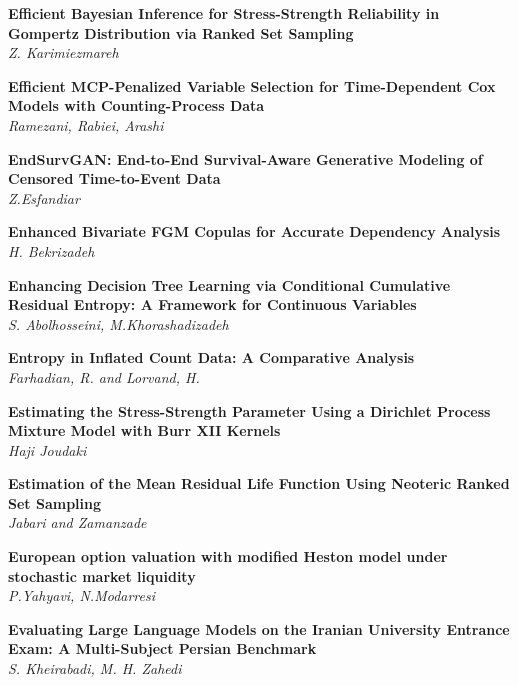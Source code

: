 \noindent
{\bf
Efficient Bayesian Inference for Stress-Strength Reliability in Gompertz Distribution via Ranked Set Sampling
}\dotfill \pageref{p.1128}\\
{\small \it
Z. Karimiezmareh
}


\noindent
{\bf
Efficient MCP-Penalized Variable Selection for Time-Dependent Cox Models with Counting-Process Data
}\dotfill \pageref{p.1335}\\
{\small \it
Ramezani, Rabiei, Arashi
}


\noindent
{\bf
EndSurvGAN: End-to-End Survival-Aware Generative Modeling of Censored Time-to-Event Data
}\dotfill \pageref{p.1180}\\
{\small \it
Z.Esfandiar
}


\noindent
{\bf
Enhanced Bivariate FGM Copulas for Accurate Dependency Analysis
}\dotfill \pageref{p.1033}\\
{\small \it
H. Bekrizadeh
}


\noindent
{\bf
Enhancing Decision Tree Learning via Conditional Cumulative Residual Entropy: A Framework for Continuous Variables
}\dotfill \pageref{p.1181}\\
{\small \it
S. Abolhosseini, M.Khorashadizadeh
}


\noindent
{\bf
Entropy in Inflated Count Data: A Comparative Analysis
}\dotfill \pageref{p.1003}\\
{\small \it
Farhadian, R. and Lorvand, H.
}


\noindent
{\bf
Estimating the Stress-Strength Parameter Using a Dirichlet Process Mixture Model with Burr XII Kernels
}\dotfill \pageref{p.1131}\\
{\small \it
Haji Joudaki
}


\noindent
{\bf
Estimation of the Mean Residual Life Function Using Neoteric Ranked Set Sampling
}\dotfill \pageref{p.1178}\\
{\small \it
Jabari and Zamanzade
}


\noindent
{\bf
European option valuation with modified Heston model under stochastic market liquidity
}\dotfill \pageref{p.1041}\\
{\small \it
P.Yahyavi, N.Modarresi
}


\noindent
{\bf
Evaluating Large Language Models on the Iranian University Entrance Exam: A Multi-Subject Persian Benchmark
}\dotfill \pageref{p.1258}\\
{\small \it
S. Kheirabadi, M. H. Zahedi
}


